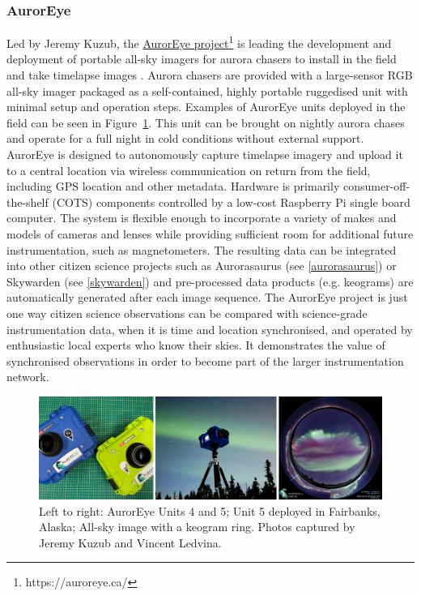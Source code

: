\documentclass{article}
\renewcommand{\cite}[1]{\parencite{#1}}
\begin{document}
\subsubsection{AurorEye}

Led by Jeremy Kuzub, the \href{https://auroreye.ca/}{AurorEye project}\footnote{https://auroreye.ca/} is leading the development and deployment of portable all-sky imagers for aurora chasers to install in the field and take timelapse images \cite{Kuzub2022}. Aurora chasers are provided with a large-sensor RGB all-sky imager packaged as a self-contained, highly portable ruggedised unit with minimal setup and operation steps. Examples of AurorEye units deployed in the field can be seen in Figure~\ref{fig-auroraeye}. This unit can be brought on nightly aurora chases and operate for a full night in cold conditions without external support. AurorEye is designed to autonomously capture timelapse imagery and upload it to a central location via wireless communication on return from the field, including GPS location and other metadata. Hardware is primarily consumer-off-the-shelf (COTS) components controlled by a low-cost Raspberry Pi single board computer. The system is flexible enough to incorporate a variety of makes and models of cameras and lenses while providing sufficient room for additional future instrumentation, such as magnetometers. The resulting data can be integrated into other citizen science projects such as Aurorasaurus (see \ref{aurorasaurus}) or Skywarden (see \ref{skywarden}) and pre-processed data products (e.g. keograms) are automatically generated after each image sequence. The AurorEye project is just one way citizen science observations can be compared with science-grade instrumentation data, when it is time and location synchronised, and operated by enthusiastic local experts who know their skies. It demonstrates the value of synchronised observations in order to become part of the larger instrumentation network. 

\begin{figure}
  \includegraphics[width=\linewidth]{Fig16_AurorEye.jpg}
  \caption{Left to right: AurorEye Units 4 and 5; Unit 5 deployed in Fairbanks, Alaska; All-sky image with a keogram ring. Photos captured by Jeremy Kuzub and Vincent Ledvina.}
  \label{fig-auroraeye}
\end{figure}
\end{document}
